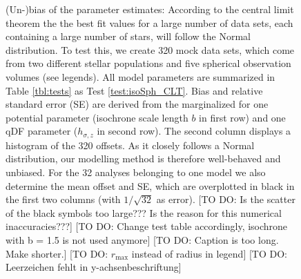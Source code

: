 


\begin{figure}
\caption{(Un-)bias of the parameter estimates: According to the central limit theorem the the best fit values for a large number of data sets, each containing a large number of stars, will follow the Normal distribution. To test this, we create 320 mock data sets, which come from two different stellar populations and five spherical observation volumes (see legends). All model parameters are summarized in Table \ref{tbl:tests} as Test \ref{test:isoSph_CLT}. Bias and relative standard error (SE) are derived from the marginalized \pdf{} for one potential parameter (isochrone scale length $b$ in first row) and one qDF parameter ($h_{\sigma,z}$ in second row). The second column displays a histogram of the 320 offsets. As it closely follows a Normal distribution, our modelling method is therefore well-behaved and unbiased. For the 32 analyses belonging to one model we also determine the mean offset and SE, which are overplotted in black in the first two columns (with $1/\sqrt{32}$ as error).  [TO DO: Is the scatter of the black symbols too large??? Is the reason for this numerical inaccuracies???] [TO DO: Change test table accordingly, isochrone with b = 1.5 is not used anymore] [TO DO: Caption is too long. Make shorter.] [TO DO: $r_\text{max}$ instead of radius in legend] [TO DO: Leerzeichen fehlt in y-achsenbeschriftung]}
\label{fig:isoSph_CLT}
\end{figure}



